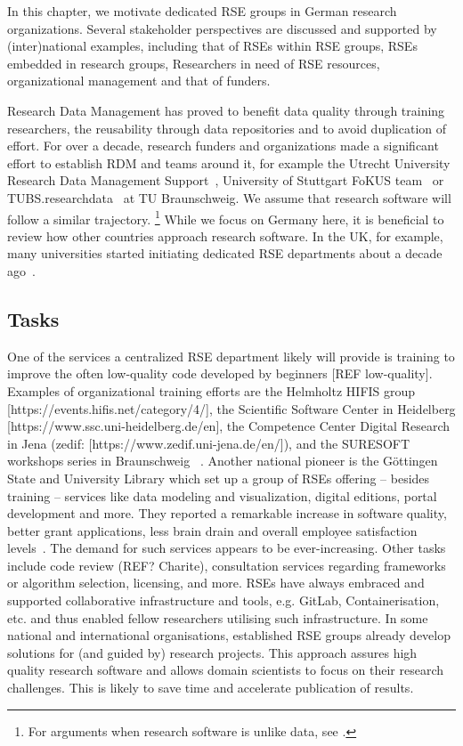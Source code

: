 \documentclass[a4paper]{article}
\begin{document}
In this chapter, we motivate dedicated RSE groups in German research organizations.
Several stakeholder perspectives are discussed and supported by (inter)national examples, including that of RSEs within RSE groups, RSEs embedded in research groups, Researchers in need of RSE resources, organizational management and that of funders.

Research Data Management has proved to benefit data quality through training researchers, the reusability through data repositories and to avoid duplication of effort.
For over a decade, research funders and organizations made a significant effort to establish RDM and teams around it, for example the Utrecht University Research Data Management Support~\autocite{UtrechtRDM}, University of Stuttgart FoKUS team~\autocite{Boehlke2024} or TUBS.researchdata~\autocite{Grunwald2022} at TU Braunschweig.
We assume that research software will follow a similar trajectory.
\footnote{For arguments when research software is unlike data, see \autocite{Lamprecht2020}.}
While we focus on Germany here, it is beneficial to review how other countries approach research software.
In the UK, for example, many universities started initiating dedicated RSE departments about a decade ago~\autocite{Crouch2013}.

\subsection{Tasks}

One of the services a centralized RSE department likely will provide is training to improve the often low-quality code developed by beginners [REF low-quality].
Examples of organizational training efforts are the Helmholtz HIFIS group [https://events.hifis.net/category/4/], the Scientific Software Center in Heidelberg [https://www.ssc.uni-heidelberg.de/en], the Competence Center Digital Research in Jena (zedif: [https://www.zedif.uni-jena.de/en/]), and the SURESOFT workshops series in Braunschweig ~\autocite{SURESOFTLink, Blech2022}.
Another national pioneer is the Göttingen State and University Library which set up a group of RSEs offering – besides training – services like data modeling and visualization, digital editions, portal development and more. They reported a remarkable increase in software quality, better grant applications, less brain drain and overall employee satisfaction levels~\autocite{schimavoigt2023}.
The demand for such services appears to be ever-increasing.
Other tasks include code review (REF? Charite), consultation services regarding frameworks or algorithm selection, licensing, and more. 
RSEs have always embraced and supported collaborative infrastructure and tools, e.g. GitLab, Containerisation, etc. and thus enabled fellow researchers utilising such infrastructure. 
In some national and international organisations, established RSE groups already develop solutions for (and guided by) research projects. This approach assures high quality research software and allows domain scientists to focus on their research challenges. 
This is likely to save time and accelerate publication of results.
\end{document}
